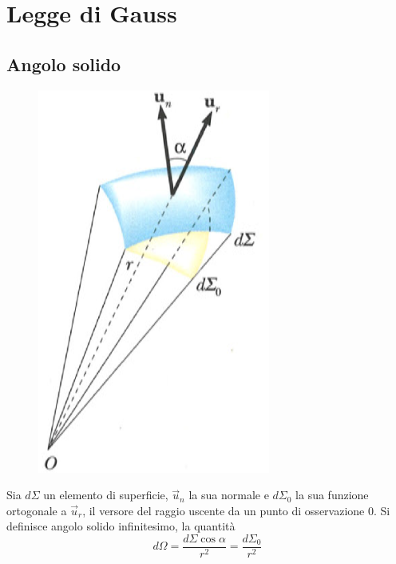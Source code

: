 \documentclass[class=book, crop=false, oneside, 12pt]{standalone}
\begin{document}
\chapter{Legge di Gauss}

\section{Angolo solido}

\begin{figure}[h]
    \includegraphics[scale=0.5]{angolo_solido}
    \centering
    \caption{}
\end{figure}

Sia \(d \Sigma\) un elemento di superficie, \(\overrightarrow{u}_n\) la sua normale e \(d \Sigma_0\) la sua funzione ortogonale a \(\overrightarrow{u}_r\), il versore del raggio uscente da un punto di osservazione \(0\). 
Si definisce angolo solido infinitesimo, la quantità
\begin{equation}
    d \Omega = \frac{d \Sigma \cos \alpha}{r^2} = \frac{d \Sigma_0}{r^2}
\end{equation}
\end{document}
